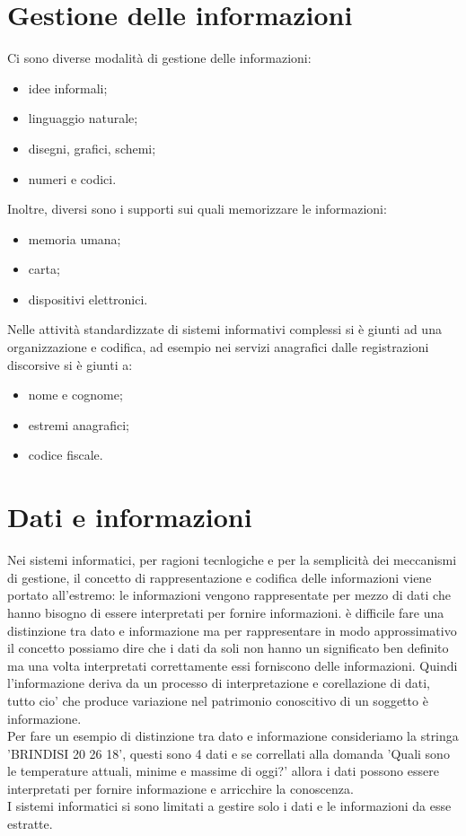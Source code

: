 \documentclass[12pt]{report}
\begin{document}
		\section{Gestione delle informazioni}
		Ci sono diverse modalità di gestione delle informazioni:
		\begin{itemize}
			\item idee informali;
			\item linguaggio naturale;
			\item disegni, grafici, schemi;
			\item numeri e codici.
		\end{itemize}
		Inoltre, diversi sono i supporti sui quali memorizzare le informazioni:
		\begin{itemize}
			\item memoria umana;
			\item carta;
			\item dispositivi elettronici.
		\end{itemize}
		Nelle attività standardizzate di sistemi informativi complessi si è giunti ad una organizzazione e codifica, ad esempio nei servizi anagrafici dalle registrazioni discorsive si è giunti a:
		\begin{itemize}
			\item nome e cognome;
			\item estremi anagrafici;
			\item codice fiscale.
		\end{itemize}
		\section{Dati e informazioni}
			Nei sistemi informatici, per ragioni tecnlogiche e per la semplicità dei meccanismi di gestione, il concetto di rappresentazione e codifica delle informazioni viene portato all'estremo: le informazioni vengono rappresentate per mezzo di dati che hanno bisogno di essere interpretati per fornire informazioni. è difficile fare una distinzione tra dato e informazione ma per rappresentare in modo approssimativo il concetto possiamo dire che i dati da soli non hanno un significato ben definito ma una volta interpretati correttamente essi forniscono delle informazioni. Quindi l'informazione deriva da un processo di interpretazione e corellazione di dati, tutto cio' che produce variazione nel patrimonio conoscitivo di un soggetto è informazione. \\
			Per fare un esempio di distinzione tra dato e informazione consideriamo la stringa 'BRINDISI  20 26 18', questi sono 4 dati e se correllati alla domanda 'Quali sono le temperature attuali, minime e massime di oggi?' allora i dati possono essere interpretati per fornire informazione e arricchire la conoscenza. \\
			I sistemi informatici si sono limitati a gestire solo i dati e le informazioni da esse estratte. \\
\end{document}
